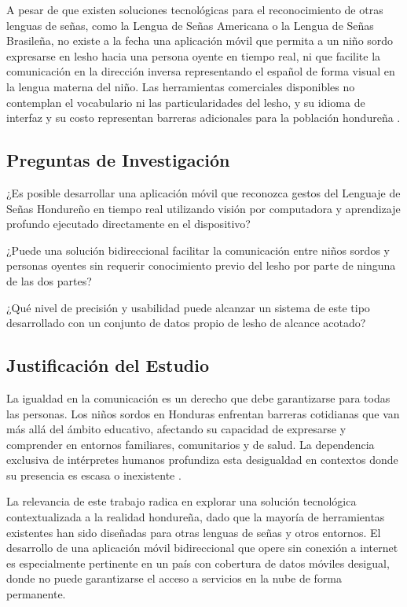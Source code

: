 A pesar de que existen soluciones tecnológicas para el reconocimiento de otras lenguas de
señas, como la Lengua de Señas Americana o la Lengua de Señas Brasileña, no existe a la
fecha una aplicación móvil que permita a un niño sordo expresarse en \acrshort{lesho} hacia una
persona oyente en tiempo real, ni que facilite la comunicación en la dirección inversa
representando el español de forma visual en la lengua materna del niño. Las herramientas
comerciales disponibles no contemplan el vocabulario ni las particularidades del \acrshort{lesho}, y
su idioma de interfaz y su costo representan barreras adicionales para la población
hondureña \cite{sadik_survey_2025}.

\subsection{Preguntas de Investigación}

¿Es posible desarrollar una aplicación móvil que reconozca gestos del Lenguaje de Señas
Hondureño en tiempo real utilizando visión por computadora y aprendizaje profundo
ejecutado directamente en el dispositivo?

¿Puede una solución bidireccional facilitar la comunicación entre niños sordos y personas
oyentes sin requerir conocimiento previo del \acrshort{lesho} por parte de ninguna de las dos partes?

¿Qué nivel de precisión y usabilidad puede alcanzar un sistema de este tipo desarrollado
con un conjunto de datos propio de \acrshort{lesho} de alcance acotado?

\subsection{Justificación del Estudio}

La igualdad en la comunicación es un derecho que debe garantizarse para todas las
personas. Los niños sordos en Honduras enfrentan barreras cotidianas que van más allá
del ámbito educativo, afectando su capacidad de expresarse y comprender en entornos
familiares, comunitarios y de salud. La dependencia exclusiva de intérpretes humanos
profundiza esta desigualdad en contextos donde su presencia es escasa o inexistente \cite{congreso_decreto_2013}.

La relevancia de este trabajo radica en explorar una solución tecnológica contextualizada
a la realidad hondureña, dado que la mayoría de herramientas existentes han sido diseñadas
para otras lenguas de señas y otros entornos. El desarrollo de una aplicación móvil
bidireccional que opere sin conexión a internet es especialmente pertinente en un país
con cobertura de datos móviles desigual, donde no puede garantizarse el acceso a servicios
en la nube de forma permanente.

